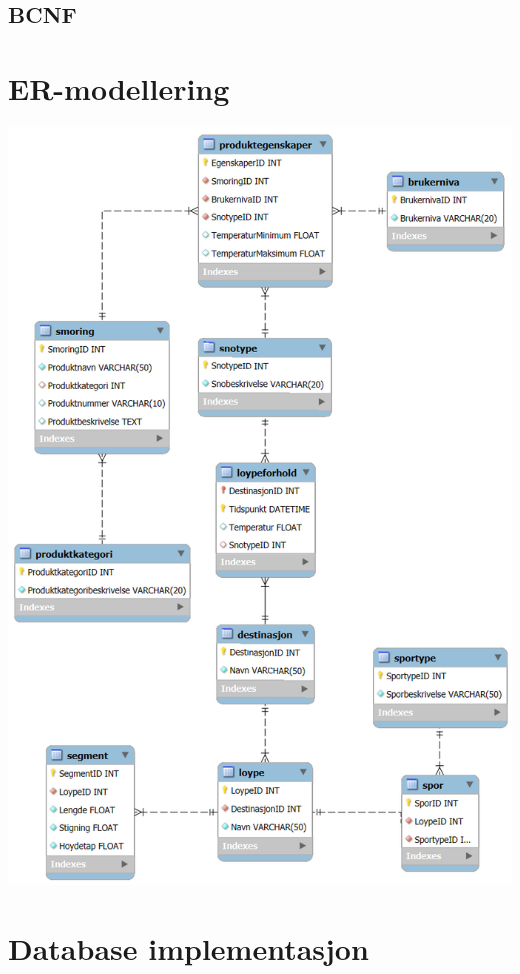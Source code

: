 \documentclass[12pt, a4paper]{article}
\begin{document}
\subsection{BCNF}

\hfill \break

\section{ER-modellering}

\includegraphics[width=\textwidth]{ermodell.png}

\section{Database implementasjon}
\end{document}
